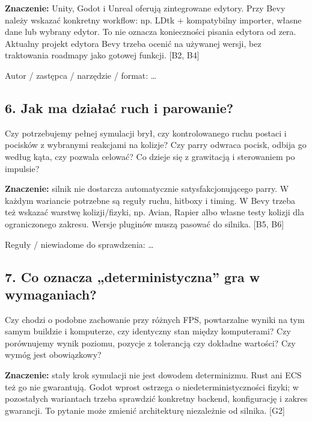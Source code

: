 \documentclass[10pt,a4paper]{article}
\begin{document}
\textbf{Znaczenie:} Unity, Godot i Unreal oferują zintegrowane edytory. Przy Bevy należy wskazać konkretny workflow: np. LDtk + kompatybilny importer, własne dane lub wybrany edytor. To nie oznacza konieczności pisania edytora od zera. Aktualny projekt edytora Bevy trzeba ocenić na używanej wersji, bez traktowania roadmapy jako gotowej funkcji. [B2, B4]



Autor / zastępca / narzędzie / format: …



\subsection*{6. Jak ma działać ruch i parowanie?}


Czy potrzebujemy pełnej symulacji brył, czy kontrolowanego ruchu postaci i pocisków z wybranymi reakcjami na kolizje? Czy parry odwraca pocisk, odbija go według kąta, czy pozwala celować? Co dzieje się z grawitacją i sterowaniem po impulsie?



\textbf{Znaczenie:} silnik nie dostarcza automatycznie satysfakcjonującego parry. W każdym wariancie potrzebne są reguły ruchu, hitboxy i timing. W Bevy trzeba też wskazać warstwę kolizji/fizyki, np. Avian, Rapier albo własne testy kolizji dla ograniczonego zakresu. Wersje pluginów muszą pasować do silnika. [B5, B6]



Reguły / niewiadome do sprawdzenia: …



\subsection*{7. Co oznacza „deterministyczna” gra w wymaganiach?}


Czy chodzi o podobne zachowanie przy różnych FPS, powtarzalne wyniki na tym samym buildzie i komputerze, czy identyczny stan między komputerami? Czy porównujemy wynik poziomu, pozycje z tolerancją czy dokładne wartości? Czy wymóg jest obowiązkowy?



\textbf{Znaczenie:} stały krok symulacji nie jest dowodem determinizmu. Rust ani ECS też go nie gwarantują. Godot wprost ostrzega o niedeterministyczności fizyki; w pozostałych wariantach trzeba sprawdzić konkretny backend, konfigurację i zakres gwarancji. To pytanie może zmienić architekturę niezależnie od silnika. [G2]
\end{document}
